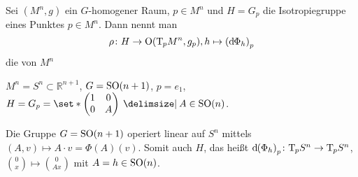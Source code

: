 \begin{definition}
	Sei $(M^n,g)$ ein $G$-homogener Raum, $p \in M^n$ und $H= G_p$ die Isotropiegruppe eines Punktes $p \in M^n$.
	Dann nennt man 
	\[
		\rho \colon H \to \On \enbrace*{\Tmap_p M^n, g_p} , h \mapsto \enbrace*{\mathd \Phi_h}_p
	\]
	die  von $M^n$ 
\end{definition}

\begin{beispiel*}
	$M^n = S^n \subset \mathbb{R}^{n+1}$, $G = \operatorname{SO}(n+1)$, $p=e_1$, $H= G_p = \set*{\begin{pmatrix}
		1 & 0 \\ 0 & A
	\end{pmatrix} \given A \in \SO(n)}$.
	
	Die Gruppe $G = \operatorname{SO}(n+1)$ operiert linear auf $S^n$ mittels $(A,v) \mapsto A \cdot v = \Phi(A)(v)$.
	Somit auch $H$, das heißt $\mathd \enbrace*{\Phi_h}_p \colon \Tmap_p S^n \to \Tmap_p S^n$, $\binom{0}{x} \mapsto \binom{0}{Ax}$ mit $A=h \in \operatorname{SO}(n)$.
\end{beispiel*}

